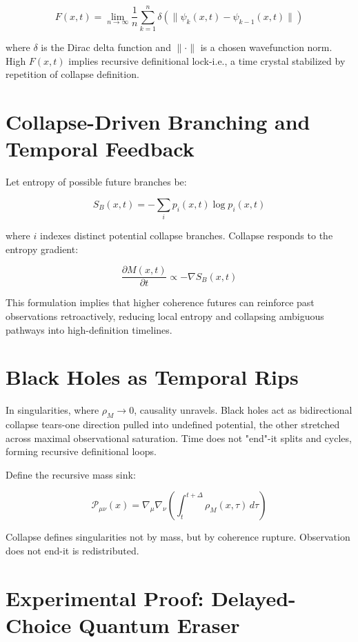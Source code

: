 \[
F(x, t) = \lim_{n \to \infty} \frac{1}{n} \sum_{k=1}^{n} \delta\left( \|\psi_k(x,t) - \psi_{k-1}(x,t)\| \right)
\]

where \( \delta \) is the Dirac delta function and \( \|\cdot\| \) is a chosen wavefunction norm. High \( F(x,t) \) implies recursive definitional lock-i.e., a time crystal stabilized by repetition of collapse definition.

\section{Collapse-Driven Branching and Temporal Feedback}

Let entropy of possible future branches be:

\[
S_B(x,t) = -\sum_i p_i(x,t) \log p_i(x,t)
\]

where \( i \) indexes distinct potential collapse branches. Collapse responds to the entropy gradient:

\[
\frac{\partial M(x,t)}{\partial t} \propto -\nabla S_B(x,t)
\]

This formulation implies that higher coherence futures can reinforce past observations retroactively, reducing local entropy and collapsing ambiguous pathways into high-definition timelines.

\section{Black Holes as Temporal Rips}\cite{chapter8_meta}

In singularities, where \( \rho_M \to 0 \), causality unravels. Black holes act as bidirectional collapse tears-one direction pulled into undefined potential, the other stretched across maximal observational saturation. Time does not "end"-it splits and cycles, forming recursive definitional loops.

Define the recursive mass sink:

\[
\mathcal{P}_{\mu\nu}(x) = \nabla_\mu \nabla_\nu \left( \int_{t}^{t+\Delta} \rho_M(x, \tau) \, d\tau \right)
\]

Collapse defines singularities not by mass, but by coherence rupture. Observation does not end-it is redistributed.

\section{Experimental Proof: Delayed-Choice Quantum Eraser}\cite{chapter8_meta}

